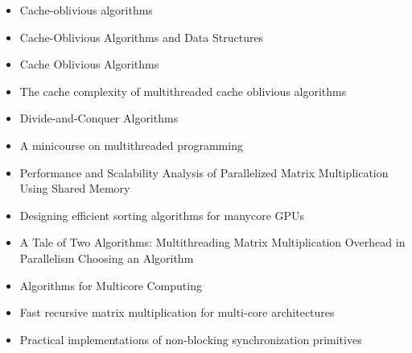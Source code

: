 \begin{itemize}
\item[\textbullet] Cache-oblivious algorithms \cite{Frigo1999}
\item[\textbullet] Cache-Oblivious Algorithms and Data Structures
  \cite{Demaine2002}
\item[\textbullet] Cache Oblivious Algorithms \cite{Kumar2003}
\item[\textbullet] The cache complexity of multithreaded cache
  oblivious algorithms \cite{Frigo2009}
\item[\textbullet] Divide-and-Conquer Algorithms \cite{Gurari2010}
\item[\textbullet] A minicourse on multithreaded programming
  \cite{Leiserson1998}
\item[\textbullet] Performance and Scalability Analysis of
  Parallelized Matrix Multiplication Using Shared Memory
  \cite{Dinkins2007}
\item[\textbullet] Designing efficient sorting algorithms for manycore
  GPUs \cite{Satish2009}
\item[\textbullet] A Tale of Two Algorithms: Multithreading Matrix
  Multiplication Overhead in Parallelism Choosing an Algorithm
  \cite{Steele2010}
\item[\textbullet] Algorithms for Multicore Computing
  \cite{Ramachandran2008}
\item[\textbullet] Fast recursive matrix multiplication for multi-core
  architectures \cite{Runger2010}
\item[\checkmark] Practical implementations of non-blocking
  synchronization primitives \cite{Moir1997}
\end{itemize}



